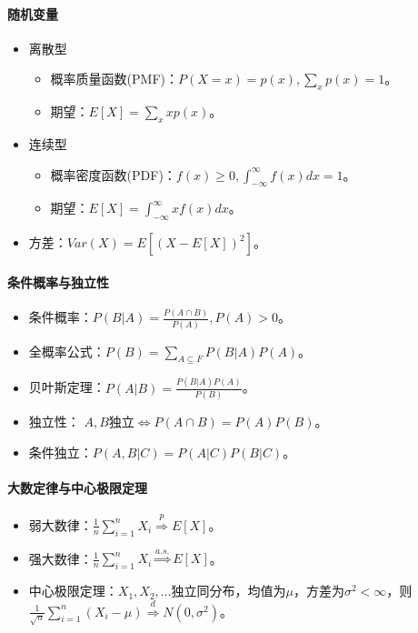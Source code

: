 \documentclass[
12pt, %
a4paper, 
oneside, %
headinclude,footinclude, %
]{scrartcl}
\begin{document}
\paragraph{随机变量}
\begin{itemize}
\item 离散型
\begin{itemize}
\item 概率质量函数(PMF)：$ P(X = x) = p(x), \sum_{x} p(x) = 1 $。
\item 期望：$ E[X] = \sum_{x} x p(x) $。
\end{itemize}
\item 连续型
\begin{itemize}
\item 概率密度函数(PDF)：$ f(x) \geq 0, \int_{-\infty}^{\infty} f(x) dx = 1 $。
\item 期望：$ E[X] = \int_{-\infty}^{\infty} x f(x) dx $。
\end{itemize}
\item 方差：$ Var(X) = E[(X - E[X])^2] $。
\end{itemize}
\paragraph{条件概率与独立性}
\begin{itemize}
\item 条件概率：$ P(B|A) = \frac{P(A \cap B)}{P(A)}, P(A) > 0 $。
\item 全概率公式：$ P(B) = \sum_{A \subseteq F} P(B|A) P(A) $。
\item 贝叶斯定理：$ P(A|B) = \frac{P(B|A) P(A)}{P(B)} $。
\item 独立性： $ A, B $独立$ \Leftrightarrow $$ P(A \cap B) = P(A)P(B) $。
\item 条件独立：$ P(A, B|C) = P(A|C)P(B|C) $。
\end{itemize}
\paragraph{大数定律与中心极限定理}
\begin{itemize}
\item 弱大数律：$ \frac{1}{n} \sum_{i = 1}^n X_i \overset{p}{\Longrightarrow} E[X] $。
\item 强大数律：$ \frac{1}{n} \sum_{i = 1}^n X_i \overset{a.s.}{\Longrightarrow} E[X] $。
\item 中心极限定理：$ X_1, X_2, \dots $独立同分布，均值为$ \mu $，方差为$ \sigma^2 < \infty $，则$ \frac{1}{\sqrt{n}} \sum_{i = 1}^n (X_i - \mu) \overset{d}{\Longrightarrow} N(0, \sigma^2) $。
\end{itemize}
\end{document}
